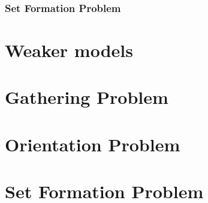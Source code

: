 \documentclass{beamer}
\begin{document}
\subsubsection{Set Formation Problem}
\begin{frame}
	
\end{frame}

\section{Weaker models}


\section{Gathering Problem}
\begin{frame}
\end{frame}
\section{Orientation Problem}
\begin{frame}
\end{frame}
\section{Set Formation Problem}
\begin{frame}
\end{frame}
\end{document}
